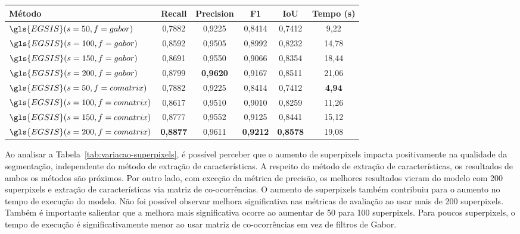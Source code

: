 \begin{table}[!h]
    \centering
  \begin{tabular}{lccccc}
    \toprule
    \textbf{Método}                  & \textbf{Recall} & \textbf{Precision} & \textbf{F1}     & \textbf{IoU}    & \textbf{Tempo (s)} \\
    \midrule \midrule
    $\gls{EGSIS}(s=50, f=gabor)$     & 0,7882          & 0,9225             & 0,8414          & 0,7412          & 9,22             \\
    $\gls{EGSIS}(s=100, f=gabor)$    & 0,8592          & 0,9505             & 0,8992          & 0,8232          & 14,78            \\
    $\gls{EGSIS}(s=150, f=gabor)$    & 0,8691          & 0,9550             & 0,9066          & 0,8354          & 18,44            \\
    $\gls{EGSIS}(s=200, f=gabor)$    & 0,8799          & \textbf{0,9620}    & 0,9167          & 0,8511          & 21,06            \\
    $\gls{EGSIS}(s=50, f=comatrix)$  & 0,7882          & 0,9225             & 0,8414          & 0,7412          & \textbf{4,94}    \\
    $\gls{EGSIS}(s=100, f=comatrix)$ & 0,8617          & 0,9510             & 0,9010          & 0,8259          & 11,26            \\
    $\gls{EGSIS}(s=150, f=comatrix)$ & 0,8777          & 0,9552             & 0,9125          & 0,8441          & 15,12            \\
    $\gls{EGSIS}(s=200, f=comatrix)$ & \textbf{0,8877} & 0,9611             & \textbf{0,9212} & \textbf{0,8578} & 19,08            \\
    \bottomrule
  \end{tabular}
  \Fonte{\fonteautor}
\end{table}

Ao analisar a Tabela~\ref{tab:variacao-superpixels}, é possível
perceber que o aumento de superpixels impacta positivamente na
qualidade da segmentação, independente do método de extração de
características. A respeito do método de extração de características,
os resultados de ambos os métodos são próximos. Por outro lado, com
exceção da métrica de precisão, os melhores resultados vieram do
modelo com 200 superpixels e extração de características via matriz de
co-ocorrências. O aumento de superpixels também contribuiu para o
aumento no tempo de execução do modelo. Não foi possível observar
melhora significativa nas métricas de avaliação ao usar mais de 200
superpixels. Também é importante salientar que a melhora mais significativa
ocorre ao aumentar de 50 para 100 superpixels. Para poucos
superpixels, o tempo de execução é significativamente menor ao usar
matriz de co-ocorrências em vez de filtros de Gabor.

